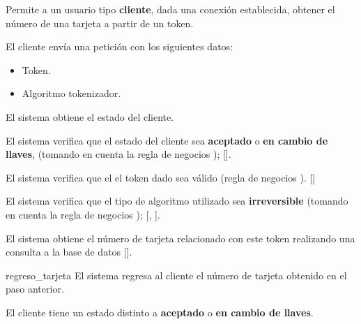 %
%

{
  Permite a un usuario tipo \textbf{cliente}, dada una conexión establecida, obtener el
  número de una tarjeta a partir de un token.

  \begin{trayectoriaPrincipal}

    \item El cliente envía una petición con los siguientes datos:
      \begin{itemize}
        \item Token.
        \item Algoritmo tokenizador.
      \end{itemize}

    \item El sistema obtiene el estado del cliente.

    \item El sistema verifica que el estado del cliente sea \textbf{aceptado}
      o \textbf{en cambio de llaves}, (tomando en cuenta la regla de negocios
      );
      [].

    \item El sistema verifica que el el token dado sea válido (regla de
      negocios ).
      []

    \item El sistema verifica que el tipo de algoritmo utilizado sea
      \textbf{irreversible} (tomando en cuenta la regla de negocios
      );
      [,
      ].

    \item El sistema obtiene el número de tarjeta relacionado con este token
      realizando una consulta a la base de datos
      [].

    \item [regreso_tarjeta] El sistema regresa al cliente el número de tarjeta
      obtenido en el paso anterior.

  \end{trayectoriaPrincipal}

  \begin{trayectoriaAlternativa}
    {El cliente tiene un estado distinto a \textbf{aceptado} o
      \textbf{en cambio de llaves}.}


\end{trayectoriaAlternativa}}
